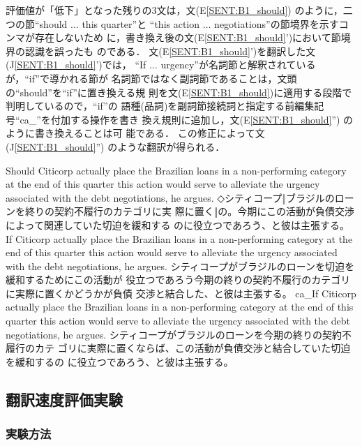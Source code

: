 評価値が「低下」となった残りの3文は，文(E\ref{SENT:B1_should})
のように，二つの節``should $\ldots$ this quarter''と
``this action $\ldots$ negotiations''の節境界を示すコンマが存在しないため
に，書き換え後の文(E\ref{SENT:B1_should}')において節境界の認識を誤ったも
のである．
文(E\ref{SENT:B1_should}')を翻訳した文(J\ref{SENT:B1_should}')では，
``If $\ldots$ urgency''が名詞節と解釈されているが，``if''で導かれる節が
名詞節ではなく副詞節であることは，文頭の``should''を``if''に置き換える規
則を文(E\ref{SENT:B1_should})に適用する段階で判明しているので，``if''の
語種(品詞)を副詞節接続詞と指定する前編集記号``ca\_''を付加する操作を書き
換え規則に追加し，文(E\ref{SENT:B1_should}'') のように書き換えることは可
能である．
この修正によって文(J\ref{SENT:B1_should}'') のような翻訳が得られる．
\begin{SENT3}
 Should Citicorp actually place the Brazilian loans in a non-performing 
category at the end of this quarter this action would serve to alleviate 
the urgency associated with the debt negotiations, he argues. 
 ◇シティコープ‖ブラジルのローンを終りの契約不履行のカテゴリに実
際に置く‖の。今期にこの活動が負債交渉によって関連していた切迫を緩和する
のに役立つであろう、と彼は主張する。
 If Citicorp actually place the Brazilian loans in a non-performing 
category at the end of this quarter this action would serve to alleviate 
the urgency associated with the debt negotiations, he argues.
 シティコープがブラジルのローンを切迫を緩和するためにこの活動が
役立つであろう今期の終りの契約不履行のカテゴリに実際に置くかどうかが負債
交渉と結合した、と彼は主張する。 
 ca\_If Citicorp actually place the Brazilian loans in a non-performing 
category at the end of this quarter this action would serve to alleviate 
the urgency associated with the debt negotiations, he argues.
 シティコープがブラジルのローンを今期の終りの契約不履行のカテ
ゴリに実際に置くならば、この活動が負債交渉と結合していた切迫を緩和するの
に役立つであろう、と彼は主張する。
\label{SENT:B1_should}
\end{SENT3}

\subsection{翻訳速度評価実験}

\subsubsection{実験方法}

